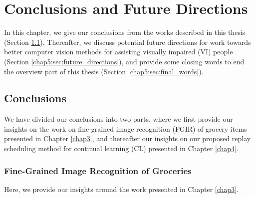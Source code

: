 
\chapter{Conclusions and Future Directions}\label{chap5}

In this chapter, we give our conclusions from the works described in this thesis (Section \ref{chap5:sec:conclusions}). Thereafter, we discuss potential future directions for work towards better computer vision methods for assisting visually impaired (VI) people (Section \ref{chap5:sec:future_directions}), and provide some closing words to end the overview part of this thesis (Section \ref{chap5:sec:final_words}). 


\section{Conclusions}\label{chap5:sec:conclusions}

We have divided our conclusions into two parts, where we first provide our insights on the work on fine-grained image recognition (FGIR) of grocery items presented in Chapter \ref{chap3}, and thereafter our insights on our proposed replay scheduling method for continual learning (CL) presented in Chapter \ref{chap4}. 


\subsection{Fine-Grained Image Recognition of Groceries}

Here, we provide our insights around the work presented in Chapter \ref{chap3}.

\vspace{-3mm}
